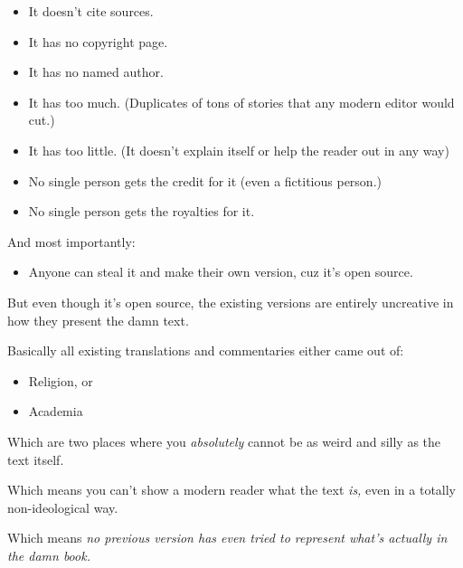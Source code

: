 \begin{itemize}

\item It doesn't cite sources.

\item It has no copyright page.

\item It has no named author.

\item It has too much. (Duplicates of tons of stories that any modern editor would cut.)

\item It has too little. (It doesn't explain itself or help the reader out in any way)

\item No single person gets the credit for it (even a fictitious person.)

\item No single person gets the royalties for it.

\end{itemize}

And most importantly:

\begin{itemize}

\item Anyone can steal it and make their own version, cuz it's open source.

\end{itemize}

But even though it's open source, the existing versions are entirely uncreative in how they present the damn text.

Basically all existing translations and commentaries either came out of:

\begin{itemize}

\item Religion, or

\item Academia

\end{itemize}

Which are two places where you \emph{absolutely} cannot be as weird and silly as the text itself.

Which means you can't show a modern reader what the text \emph{is,} even in a totally non-ideological way.

Which means \emph{no previous version has even tried to represent what's actually in the damn book.}

